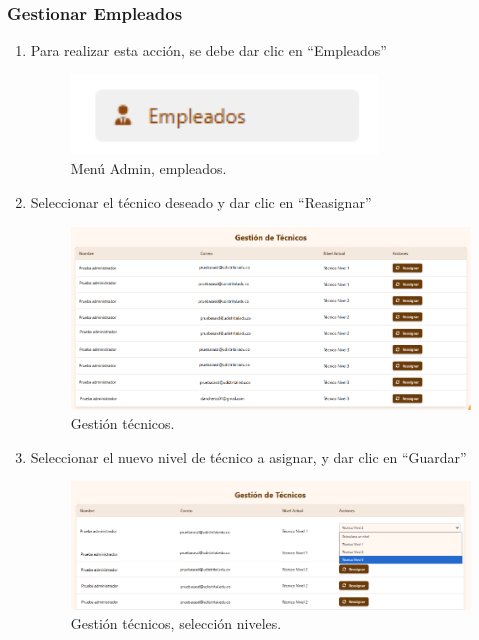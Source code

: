 \subsubsection{Gestionar Empleados}

\begin{enumerate}
\item Para realizar esta acción, se debe dar clic en “Empleados”

\begin{figure}[H]
    \centering
    \includegraphics[width=0.3\linewidth]{guiamodulo/menu-admin-empleados.png}
    \caption{Menú Admin, empleados.}
    \label{fig:menu-admin-empleados}
\end{figure}

\item  Seleccionar el técnico deseado y dar clic en “Reasignar”

\begin{figure}[H]
    \centering
    \includegraphics[width=0.7\linewidth]{guiamodulo/gestion-tecnicos.png}
    \caption{Gestión técnicos.}
    \label{fig:gestion-tecnicos.png}
\end{figure}

\item Seleccionar el nuevo nivel de técnico a asignar, y dar clic en “Guardar”

\begin{figure}[H]
    \centering
    \includegraphics[width=0.7\linewidth]{guiamodulo/gestion-tecnicos-menu.png}
    \caption{Gestión técnicos, selección niveles.}
    \label{fig:gestion-tecnicos-menu.png}
\end{figure}


\end{enumerate}
